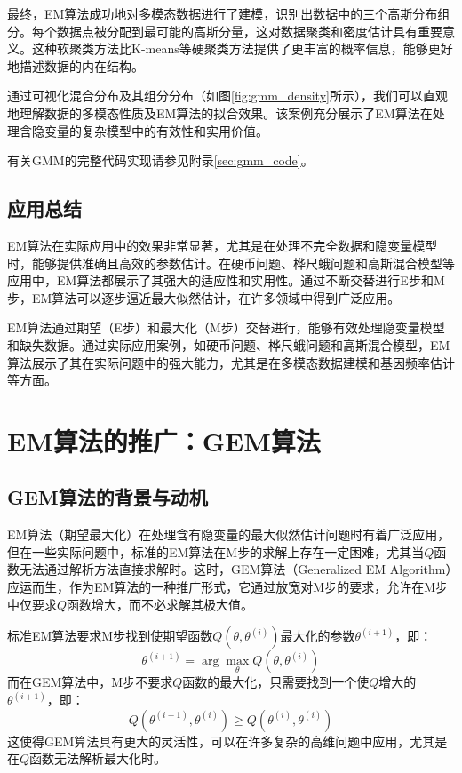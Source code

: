 \documentclass[a4paper,12pt]{ctexart} %
\begin{document}
最终，EM算法成功地对多模态数据进行了建模，识别出数据中的三个高斯分布组分。每个数据点被分配到最可能的高斯分量，这对数据聚类和密度估计具有重要意义。这种软聚类方法比K-means等硬聚类方法提供了更丰富的概率信息，能够更好地描述数据的内在结构。

通过可视化混合分布及其组分分布（如图\ref{fig:gmm_density}所示），我们可以直观地理解数据的多模态性质及EM算法的拟合效果。该案例充分展示了EM算法在处理含隐变量的复杂模型中的有效性和实用价值。

有关GMM的完整代码实现请参见附录\ref{sec:gmm_code}。

\subsection{应用总结}

EM算法在实际应用中的效果非常显著，尤其是在处理不完全数据和隐变量模型时，能够提供准确且高效的参数估计。在硬币问题、桦尺蛾问题和高斯混合模型等应用中，EM算法都展示了其强大的适应性和实用性。通过不断交替进行E步和M步，EM算法可以逐步逼近最大似然估计，在许多领域中得到广泛应用。

\begin{learnbox}{\kaishu
EM算法通过期望（E步）和最大化（M步）交替进行，能够有效处理隐变量模型和缺失数据。通过实际应用案例，如硬币问题、桦尺蛾问题和高斯混合模型，EM算法展示了其在实际问题中的强大能力，尤其是在多模态数据建模和基因频率估计等方面。}
\end{learnbox}

\section{EM算法的推广：GEM算法}

\subsection{GEM算法的背景与动机}

EM算法（期望最大化）在处理含有隐变量的最大似然估计问题时有着广泛应用，但在一些实际问题中，标准的EM算法在M步的求解上存在一定困难，尤其当$Q$函数无法通过解析方法直接求解时。这时，GEM算法（Generalized EM Algorithm）应运而生，作为EM算法的一种推广形式，它通过放宽对M步的要求，允许在M步中仅要求$Q$函数增大，而不必求解其极大值。

标准EM算法要求M步找到使期望函数$Q(\theta, \theta^{(i)})$最大化的参数$\theta^{(i+1)}$，即：
\begin{equation}
\theta^{(i+1)} = \arg \max_{\theta} Q(\theta, \theta^{(i)})
\end{equation}
而在GEM算法中，M步不要求$Q$函数的最大化，只需要找到一个使$Q$增大的$\theta^{(i+1)}$，即：
\begin{equation}
Q(\theta^{(i+1)}, \theta^{(i)}) \geq Q(\theta^{(i)}, \theta^{(i)})
\end{equation}
这使得GEM算法具有更大的灵活性，可以在许多复杂的高维问题中应用，尤其是在$Q$函数无法解析最大化时。
\end{document}
